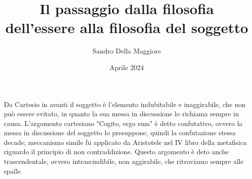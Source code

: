 \documentclass[a4paper,12pt,oneside]{article}%
\begin{document}
	\author{Sandro Della Maggiore}
	\title{Il passaggio dalla filosofia dell'essere alla filosofia del soggetto}
	\date{Aprile 2024}
	
	\maketitle

Da Cartesio in avanti il soggetto è l'elemento indubitabile e inaggirabile, che non può essere evitato, in quanto la sua messa in discussione lo richiama sempre in causa. L'argomento cartesiano "Cogito, ergo sum" è detto confutativo, ovvero la messa in discussione del soggetto lo presuppone, quindi la confutazione stessa decade; meccanismo simile fu applicato da Aristotele nel IV libro della metafisica riguardo il principio di non contraddizione. Questo argomento è deto anche trascendentale, ovvero intrascindibile, non aggirabile, che ritroviamo sempre alle spalle.
	
\end{document}
